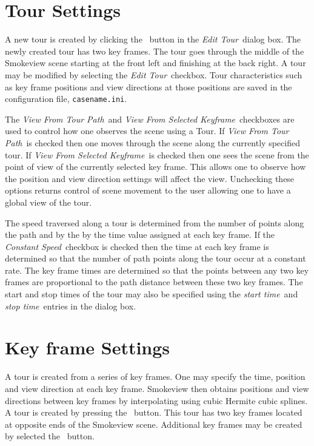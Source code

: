\documentclass[11pt,twoside]{book}
\newcommand{\frameit}[1]{\fbox{\tt #1}}
\begin{document}
\section{Tour Settings}
A new tour is created
by clicking the \frameit{New Tour}\ button in the {\em Edit Tour}\ dialog box.
The newly created tour has two key frames.  The tour
goes through the middle of the Smokeview scene starting at the
front left and finishing at the back right.
A tour may be modified by selecting the {\em Edit Tour}\ checkbox.
Tour characteristics such as key frame positions and view directions at those positions
are saved in the configuration file, {\tt casename.ini}.

The {\em View From Tour Path}\ and  {\em
View From Selected Keyframe}\ checkboxes are used to control how one observes the
scene using a Tour.  If {\em View From Tour Path}\ is checked then one moves through the
scene along the currently specified tour.  If {\em
View From Selected Keyframe}\ is checked then one sees the scene from the point of view of the
currently selected key frame.  This allows one to observe how
the position and view direction settings will affect the view.  Unchecking these options
returns control of scene movement to the user allowing one to have a global view of the tour.

The speed traversed along a tour is determined from the number of points along the path
and by the by the time value
assigned at each key frame.   If the {\em Constant Speed}\ checkbox
is checked then the time at each key frame is determined so that
the number of path points along the tour occur at a constant rate.
The key frame times are determined so that the
points between any two key frames are proportional to the path
distance between these two key frames.
The start and stop times of the tour may also be specified using the {\em start time}\ and
{\em stop time}\ entries in the dialog box.


\section{Key frame Settings}
A tour is created from a series of key frames.  One may specify
 the time, position and view direction at each key frame.  Smokeview then
obtains positions and view directions between key frames by interpolating
using cubic Hermite cubic splines.
A tour is created by pressing the
\frameit{Add Tour}\ button.  This tour has two key frames located
at opposite ends of the Smokeview scene.  Additional key frames may
be created by selected the \frameit{Add}\ button.
\end{document}
